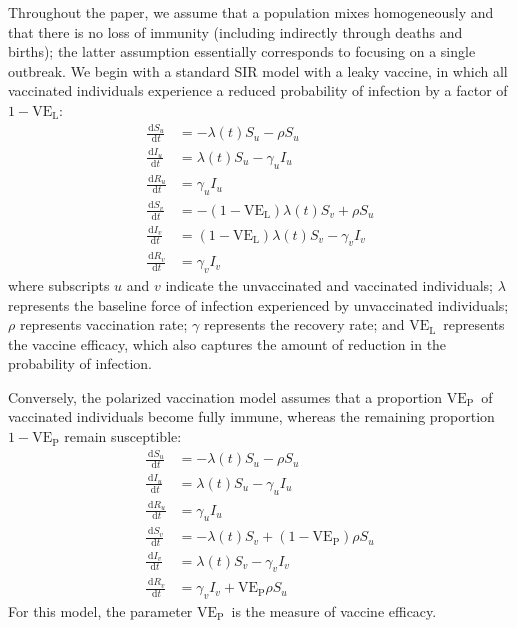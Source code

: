 \documentclass[12pt]{article}
\newcommand{\dd}[1]{\ensuremath{\, \mathrm{d}#1}}
\newcommand{\VE}{\ensuremath{\mathrm{VE}}}
\newcommand{\VEP}{\ensuremath{\VE_{\mathrm{P}}}}
\newcommand{\VEL}{\ensuremath{\VE_{\mathrm{L}}}}
\begin{document}
Throughout the paper, we assume that a population mixes homogeneously and that there is no loss of immunity (including indirectly through deaths and births); 
the latter assumption essentially corresponds to focusing on a single outbreak.
We begin with a standard SIR model with a leaky vaccine, in which all vaccinated individuals experience a reduced probability of infection by a factor of $1-\VEL$:
\begin{align}
\frac{\dd S_u}{\dd t} &= - \lambda(t) S_u - \rho S_u \\
\frac{\dd I_u}{\dd t} &= \lambda(t) S_u - \gamma_u I_u \\
\frac{\dd R_u}{\dd t} &= \gamma_u I_u \\
\frac{\dd S_v}{\dd t} &= - (1-\VEL) \lambda(t) S_v + \rho S_u \\
\frac{\dd I_v}{\dd t} &= (1-\VEL) \lambda(t) S_v - \gamma_v I_v \\
\frac{\dd R_v}{\dd t} &= \gamma_v I_v
\end{align}
where subscripts $u$ and $v$ indicate the unvaccinated and vaccinated individuals;
$\lambda$ represents the baseline force of infection experienced by unvaccinated individuals; 
$\rho$ represents vaccination rate;
$\gamma$ represents the recovery rate;
and \VEL\ represents the vaccine efficacy, which also captures the amount of reduction in the probability of infection.

Conversely, the polarized vaccination model assumes that a proportion \VEP\ of vaccinated individuals become fully immune, whereas the remaining proportion $1-\VEP$ remain susceptible: 
\begin{align}
\frac{\dd S_u}{\dd t} &= - \lambda(t) S_u - \rho S_u \\
\frac{\dd I_u}{\dd t} &= \lambda(t) S_u - \gamma_u I_u \\
\frac{\dd R_u}{\dd t} &= \gamma_u I_u \\
\frac{\dd S_v}{\dd t} &= - \lambda(t) S_v + (1-\VEP) \rho S_u \\
\frac{\dd I_v}{\dd t} &= \lambda(t) S_v - \gamma_v I_v \\
\frac{\dd R_v}{\dd t} &= \gamma_v I_v + \VEP \rho S_u
\end{align}
For this model, the parameter \VEP\ is the measure of vaccine efficacy.
\end{document}
